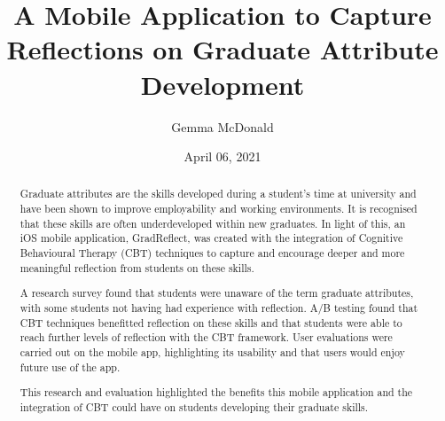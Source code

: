 \documentclass{l4proj}
\begin{document}
\title{A Mobile Application to Capture Reflections on Graduate Attribute Development}
\author{Gemma McDonald}
\date{April 06, 2021}

\maketitle

\begin{abstract}
    Graduate attributes are the skills developed during a student’s time at university and have been shown to improve employability and working environments. It is recognised that these skills are often underdeveloped within new graduates. In light of this, an iOS mobile application, GradReflect, was created with the integration of Cognitive Behavioural Therapy (CBT) techniques to capture and encourage deeper and more meaningful reflection from students on these skills. 

    A research survey found that students were unaware of the term graduate attributes, with some students not having had experience with reflection. A/B testing found that CBT techniques benefitted reflection on these skills and that students were able to reach further levels of reflection with the CBT framework. User evaluations were carried out on the mobile app, highlighting its usability and that users would enjoy future use of the app. 

    This research and evaluation highlighted the benefits this mobile application and the integration of CBT could have on students developing their graduate skills.
\end{abstract}


%
%
\def\consentname {Gemma McDonald} %
\def\consentdate {06 April 2021} %
%
\educationalconsent
\end{document}
